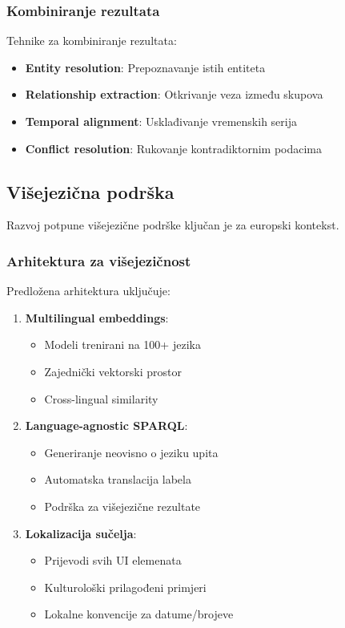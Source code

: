 \subsubsection{Kombiniranje rezultata}

Tehnike za kombiniranje rezultata:

\begin{itemize}
    \item \textbf{Entity resolution}: Prepoznavanje istih entiteta
    \item \textbf{Relationship extraction}: Otkrivanje veza između skupova
    \item \textbf{Temporal alignment}: Usklađivanje vremenskih serija
    \item \textbf{Conflict resolution}: Rukovanje kontradiktornim podacima
\end{itemize}

\subsection{Višejezična podrška}

Razvoj potpune višejezične podrške ključan je za europski kontekst.

\subsubsection{Arhitektura za višejezičnost}

Predložena arhitektura uključuje:

\begin{enumerate}
    \item \textbf{Multilingual embeddings}:
    \begin{itemize}
        \item Modeli trenirani na 100+ jezika
        \item Zajednički vektorski prostor
        \item Cross-lingual similarity
    \end{itemize}
    
    \item \textbf{Language-agnostic SPARQL}:
    \begin{itemize}
        \item Generiranje neovisno o jeziku upita
        \item Automatska translacija labela
        \item Podrška za višejezične rezultate
    \end{itemize}
    
    \item \textbf{Lokalizacija sučelja}:
    \begin{itemize}
        \item Prijevodi svih UI elemenata
        \item Kulturološki prilagođeni primjeri
        \item Lokalne konvencije za datume/brojeve
    \end{itemize}
\end{enumerate}

